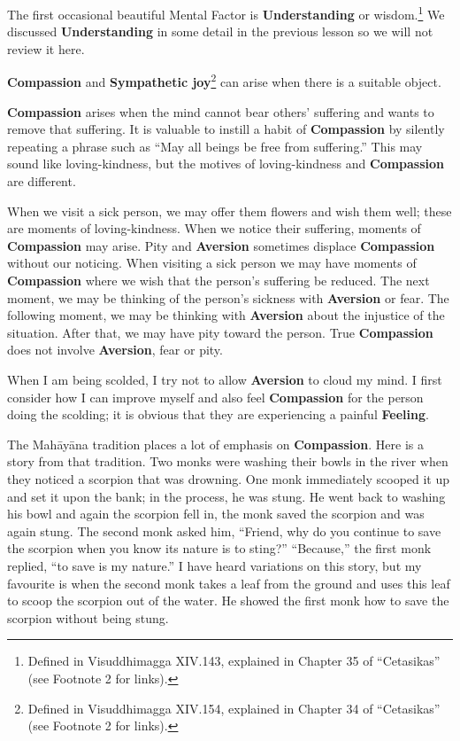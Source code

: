 The first occasional beautiful Mental Factor is \textbf{Understanding} or wisdom.\footnote{Defined in Visuddhimagga XIV.143, explained in Chapter 35 of “Cetasikas” (see Footnote 2 for links).} We discussed \textbf{Understanding} in some detail in the previous lesson so we will not review it here.

\textbf{Compassion} and \textbf{Sympathetic joy}\footnote{Defined in Visuddhimagga XIV.154, explained in Chapter 34 of “Cetasikas” (see Footnote 2 for links).} can arise when there is a suitable object.

\textbf{Compassion} arises when the mind cannot bear others’ suffering and wants to remove that suffering. It is valuable to instill a habit of \textbf{Compassion} by silently repeating a phrase such as “May all beings be free from suffering.” This may sound like loving-kindness, but the motives of loving-kindness and \textbf{Compassion} are different.

When we visit a sick person, we may offer them flowers and wish them well; these are moments of loving-kindness. When we notice their suffering, moments of \textbf{Compassion} may arise. Pity and \textbf{Aversion} sometimes displace \textbf{Compassion} without our noticing. When visiting a sick person we may have moments of \textbf{Compassion} where we wish that the person’s suffering be reduced. The next moment, we may be thinking of the person’s sickness with \textbf{Aversion} or fear. The following moment, we may be thinking with \textbf{Aversion} about the injustice of the situation. After that, we may have pity toward the person. True \textbf{Compassion} does not involve \textbf{Aversion}, fear or pity.

\pagebreak

When I am being scolded, I try not to allow \textbf{Aversion} to cloud my mind. I first consider how I can improve myself and also feel \textbf{Compassion} for the person doing the scolding; it is obvious that they are experiencing a painful \textbf{Feeling}.

The Mahāyāna tradition places a lot of emphasis on \textbf{Compassion}. Here is a story from that tradition. Two monks were washing their bowls in the river when they noticed a scorpion that was drowning. One monk immediately scooped it up and set it upon the bank; in the process, he was stung. He went back to washing his bowl and again the scorpion fell in, the monk saved the scorpion and was again stung. The second monk asked him, “Friend, why do you continue to save the scorpion when you know its nature is to sting?” “Because,” the first monk replied, “to save is my nature.” I have heard variations on this story, but my favourite is when the second monk takes a leaf from the ground and uses this leaf to scoop the scorpion out of the water. He showed the first monk how to save the scorpion without being stung.

